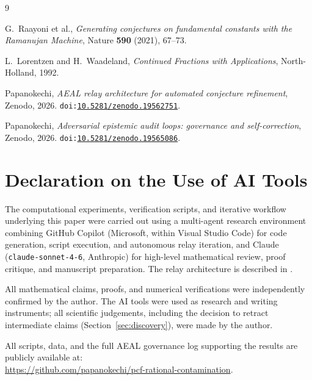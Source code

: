\documentclass[11pt]{amsart}
\theoremstyle{definition}
\theoremstyle{remark}
\begin{document}
\begin{thebibliography}{9}

G.~Raayoni et al.,
\emph{Generating conjectures on fundamental constants with the
  Ramanujan Machine},
Nature \textbf{590} (2021), 67--73.

L.~Lorentzen and H.~Waadeland,
\emph{Continued Fractions with Applications},
North-Holland, 1992.

Papanokechi,
\emph{AEAL relay architecture for automated conjecture refinement},
Zenodo, 2026.
\texttt{doi:\href{https://doi.org/10.5281/zenodo.19562751}{10.5281/zenodo.19562751}}.

Papanokechi,
\emph{Adversarial epistemic audit loops: governance and self-correction},
Zenodo, 2026.
\texttt{doi:\href{https://doi.org/10.5281/zenodo.19565086}{10.5281/zenodo.19565086}}.

\end{thebibliography}

\section*{Declaration on the Use of AI Tools}

The computational experiments, verification scripts,
and iterative workflow underlying this paper were
carried out using a multi-agent research environment
combining GitHub Copilot (Microsoft, within Visual
Studio Code) for code generation, script execution,
and autonomous relay iteration, and Claude
(\texttt{claude-sonnet-4-6}, Anthropic) for
high-level mathematical review, proof critique,
and manuscript preparation. The relay architecture
is described in \cite{aeal-paper7,aeal-paper8}.

All mathematical claims, proofs, and numerical
verifications were independently confirmed by the
author. The AI tools were used as research and
writing instruments; all scientific judgements,
including the decision to retract intermediate
claims (Section~\ref{sec:discovery}), were made by the author.

All scripts, data, and the full AEAL governance
log supporting the results are publicly available at:\\
\url{https://github.com/papanokechi/pcf-rational-contamination}.
\end{document}
